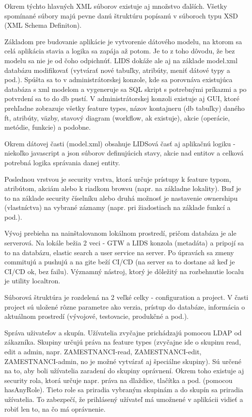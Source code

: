 Okrem týchto hlavných XML súborov existuje aj množstvo ďalších. Všetky spomínané súbory majú pevne danú štruktúru popísanú v súboroch typu XSD (XML Schema Definiton). 

Základom pre budovanie aplikácie je vytvorenie dátového modelu, na ktorom sa celá aplikácia stavia a logika sa zapája až potom. Je to z toho dôvodu, že bez modelu sa nie je od čoho odpichnúť. LIDS dokáže ale aj na základe model.xml databázu modifikovať (vytvárať nové tabuľky, atribúty, meniť dátové typy a pod.). Spúšta sa to v administrátorskej konzole, kde sa porovnáva existujúca databáza s xml modelom a vygeneruje sa SQL skript s potrebnými príkazmi a po potvrdení sa to do db pustí. V administrátorskej konzoli existuje aj GUI, ktoré prehľadne zobrazuje všetky feature types, názov kontajneru (db tabuľky) daného ft, atribúty, väzby, stavový diagram (workflow, ak existuje), akcie (operácie, metódie, funkcie) a podobne. 

Okrem dátovej časti (model.xml) obsahuje LIDSová časť aj aplikačnú logiku - niekoľko javascript a json súborov definujúcich stavy, akcie nad entitov a celková potrebná logika správania danej entity.

Poslednou vrstvou je security vrstva, ktorá určuje prístupy k feature typom, atribútom, akciám alebo k riadkom browsu (napr. na základne lokality). Buď je to na základe security číselníku alebo druhá možnosť je nastavenie ownershipu (vlastníctva) na vybrané záznamy (napr. pri žiadostiach na základe funkcí a pod.). 

Vývoj prebieha na nainštalovanom lokálnom prostredí, pričom databáza je ale serverová. Na lokále bežia 2 veci - GTW a LIDS konzola (metadáta) a pripojí sa to na databázu, elastic search a user service na server. Po úpravách sa zmeny commitujú a pushujú a na gite beží CI/CD (na server sa to dostane až keď je CI/CD ok, bez failu). Významný nástroj, ktorý je dôležitý na rozbehnutie localu je utility localtron. 

Súborová štruktúra je rozdelená na 2 veľké celky - configuration a project. V časti project sú uložené rôzne parametre ako verzia, prístup do databáze, informácia o aktuálnom prostredí (vývojové, testovacie, produkčné a pod.). 

Správa uživateľov a skupín. Užívatelia zvyčajne prichádzajú pomocou LDAP od zákazníka. Skupiny určujú práva na feature types (zvyčajne ide o skupinu read, edit a admin, napr. ZAMESTNANCI-read, ZAMESTNANCI-edit, ZAMESTNANCI-admin, no je možné vytvárať aj špeciálne skupiny). Sú určené na to, aby boli užívatelia zaradení do skupiny oprávnení. Okrem toho existuje aj security rola, ktorá určuje napr. práva na dlaždice, tlačítka a pod. (pomocou hasAnyRole). Tieto role sa priradia vybraným skupinám a do skupín sa priradia užívatelia. To zabezpečí, že prihlásený užívateľ má umožnené v aplikácii vidieť a robiť len to, na čo má oprávnenie.

